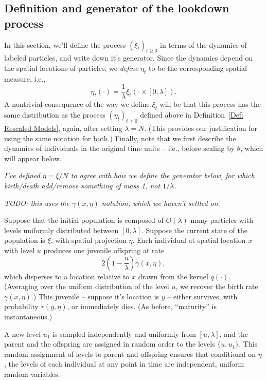 \documentclass[12pt]{article}
\newcommand{\lp}{\xi}              %
\newcommand{\comment}[1]{{\color{blue} \it #1}}
\begin{document}
\subsection{Definition and generator of the lookdown process}
\label{sec:lookdown_defn}

In this section,
we'll define the process $(\lp_t)_{t \ge 0}$ in terms of the dynamics of labeled particles,
and write down it's generator.
Since the dynamics depend on the spatial locations of particles,
we \emph{define} $\eta_t$ to be the corresponding spatial measure,
i.e.,
$$
    \eta_t(\cdot) = \frac{1}{\lambda} \lp_t(\cdot \times [0, \lambda])  .
$$
A nontrivial consequence of the way we define $\lp_t$ will be that
this process has the same distribution as the process $(\eta_t)_{t \ge 0}$ defined above
in Definition~\ref{Def: Rescaled Models},
again, after setting $\lambda = N$.
(This provides our justification for using the same notation for both.)
Finally, note that we first describe the dynamics of individuals
in the original time units -- i.e., before scaling by $\theta$,
which will appear below.

\comment{
    I've defined $\eta = \lp / N$ to agree with how we define the generator below,
    for which birth/death add/remove something of mass 1, not $1/\lambda$.
}

\comment{TODO: this uses the $\gamma(x, \eta)$ notation, which we haven't settled on.}

Suppose that the initial population is composed of $O(\lambda)$ many particles
with levels uniformly distributed between $[0, \lambda]$.
Suppose the current state of the population is $\lp$,
with spatial projection $\eta$.
Each individual at spatial location $x$ with level $u$
produces one juvenile offspring at rate 
$$
2 \left(1 - \frac{u}{\lambda}\right) \gamma(x, \eta) ,
$$
which disperses to a location relative to $x$ drawn from the kernel $q(\cdot)$.
(Averaging over the uniform distribution of the level $u$,
we recover the birth rate $\gamma(x, \eta)$.)
This juvenile -- suppose it's location is $y$ --
either survives, with probability $r(y, \eta)$, or immediately dies.
(As before, ``maturity'' is instantaneous.)

A new level $u_1$ is sampled independently and uniformly from $[u,\lambda]$,
and the parent and the offspring are assigned in random order to the levels $\{u, u_1\}$.
This random assignment of levels to parent
and offspring ensures that conditional on $\eta$,
the levels of each individual at any point in time are independent, uniform random variables.
\end{document}
